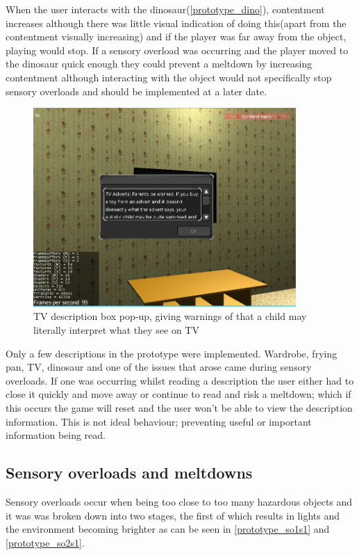When the user interacts with the dinosaur(\ref{prototype_dino}), contentment increases although there was little visual indication of doing this(apart from the contentment visually increasing) and if the player was far away from the object, playing would stop. If a sensory overload was occurring and the player moved to the dinosaur quick enough they could prevent a meltdown by increasing contentment although interacting with the object would not specifically stop sensory overloads and should be implemented at a later date. 

\begin{figure}[H]
\centering
\includegraphics[width=100mm]{images/prototype/tvdescription.png}
\caption{TV description box pop-up, giving warnings of that a child may literally interpret what they see on TV }
\label{prototype_tvdesc}
\end{figure}

Only a few descriptions in the prototype were implemented. Wardrobe, frying pan, TV, dinosaur and one of the issues that arose came during sensory overloads. If one was occurring whilst reading a description the user either had to close it quickly and move away or continue to read and risk a meltdown; which if this occurs the game will reset and the user won't be able to view the description information. This is not ideal behaviour; preventing useful or important information being read.

\subsection*{Sensory overloads and meltdowns}

Sensory overloads occur when being too close to too many hazardous objects and it was was broken down into two stages, the first of which results in lights and the environment becoming brighter as can be seen in \ref{prototype_so1s1} and \ref{prototype_so2s1}. 

